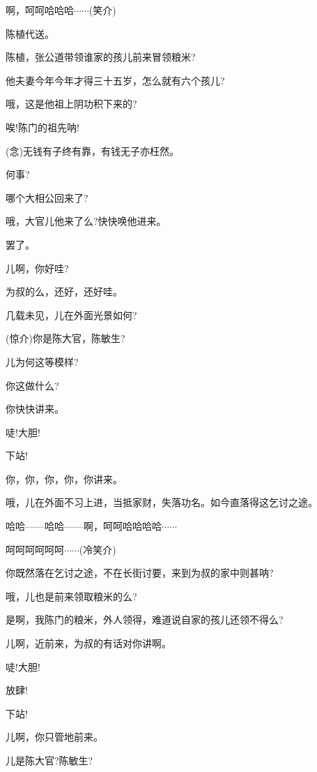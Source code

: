{啊，呵呵哈哈哈$\cdots{}\cdots{}$({\hwfs 笑介})

陈植代送。

陈植，张公道带领谁家的孩儿前来冒领粮米?

他夫妻今年今年才得三十五岁，怎么就有六个孩儿?

哦，这是他祖上阴功积下来的?

唉!陈门的祖先呐!


\vspace{5pt}

({\akai 念})无钱有子终有靠，有钱无子亦枉然。

何事?

哪个大相公回来了?

哦，大官儿他来了么?快快唤他进来。

罢了。

儿啊，你好哇?

为叔的么，还好，还好哇。

几载未见，儿在外面光景如何?

({\hwfs 惊介})你是陈大官，陈敏生?

儿为何这等模样?

你这做什么?

你快快讲来。

唗!大胆!

下站!

你，你，你，你，你讲来。

哦，儿在外面不习上进，当抵家财，失落功名。如今直落得这乞讨之途。

哈哈------哈哈------啊，呵呵哈哈哈哈$\cdots{}\cdots{}$

呵呵呵呵呵呵$\cdots{}\cdots{}$({\hwfs 冷笑介})

你既然落在乞讨之途，不在长街讨要，来到为叔的家中则甚呐?

哦，儿也是前来领取粮米的么?

是啊，我陈门的粮米，外人领得，难道说自家的孩儿还领不得么?

儿啊，近前来，为叔的有话对你讲啊。

唗!大胆!

放肆!

下站!

儿啊，你只管地前来。

儿是陈大官?陈敏生?

}
